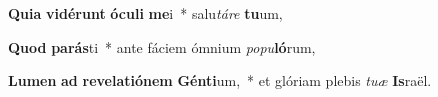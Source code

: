\item \textbf{Qui}\textbf{a} \textbf{vi}\textbf{dé}\textbf{runt} \textbf{ó}\textbf{cu}\textbf{li} \textbf{me}i~* salu\textit{tá}\textit{re} \textbf{tu}um,
\item \textbf{Quod} \textbf{pa}\textbf{rás}ti~* ante fáciem ómnium \textit{po}\textit{pu}\textbf{ló}rum,
\item \textbf{Lu}\textbf{men} \textbf{ad} \textbf{re}\textbf{ve}\textbf{la}\textbf{ti}\textbf{ó}\textbf{nem} \textbf{Gén}\textbf{ti}um,~* et glóriam plebis \textit{tu}\textit{æ} \textbf{Is}raël.

